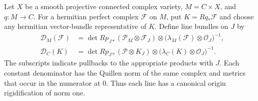 \documentclass[11pt,a4paper]{article}
\newtheorem{theorem}{Theorem}[section]
\theoremstyle{definition}
\theoremstyle{remark}
\newcommand{\rk}{\operatorname{rk}}
\newcommand{\cP}{\mathcal P}
\newcommand{\cO}{\mathcal O}
\newcommand{\cD}{\mathcal D}
\begin{document}
Let \(X\) be a smooth projective connected complex variety,
\(M=C\times X\), and \(q:M\to C\). For a hermitian perfect
complex \(\mathcal F\) on \(M\), put \(K=Rq_*\mathcal F\)
and choose any hermitian vector-bundle representative of \(K\).
Define line bundles on \(J\) by
\begin{align*}
 \cD_M(\mathcal F)
  &=\det Rp_{J*}(\cP_M\otimes\mathcal F_J)
     \otimes\bigl(\lambda_M(\mathcal F)\otimes\cO_J\bigr)^{-1},\\
 \cD_C(K)
  &=\det Rp_{J*}(\cP\otimes K_J)
     \otimes\bigl(\lambda_C(K)\otimes\cO_J\bigr)^{-1}.
\end{align*}
The subscripts indicate pullbacks to the appropriate products with
\(J\). Each constant denominator has the Quillen norm of the same
complex and metrics that occur in the numerator at \(0\).
Thus each line has a canonical origin rigidification of norm one.

\end{document}
